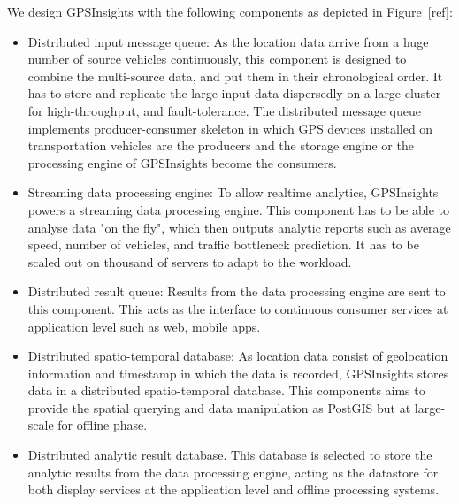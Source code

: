 \documentclass{acm_proc_article-sp}
\begin{document}

We design GPSInsights with the following components as depicted  in Figure~[ref]:

\begin{itemize}
\item 	Distributed input message queue: As the location data arrive from a huge number of source vehicles continuously, this component is designed to combine the multi-source data, and put them in their chronological order. It has to store and replicate the large input data dispersedly on a large cluster for high-throughput, and fault-tolerance. The distributed message queue implements producer-consumer skeleton in which GPS devices installed on transportation vehicles are the producers and the storage engine or the processing engine of GPSInsights become the consumers.

\item  Streaming data processing engine: To allow realtime analytics, GPSInsights powers a streaming data processing engine. This component has to be able to analyse data "on the fly", which then outputs analytic reports such as average speed, number of vehicles, and traffic bottleneck prediction. It has to be scaled out on thousand of servers to adapt to the workload.

\item  Distributed result queue: Results from the data processing engine are sent to this component. This acts as the interface to continuous consumer services at application level such as web, mobile apps. 

\item  Distributed spatio-temporal database: As location data consist of geolocation information and timestamp in which the data is recorded, GPSInsights stores data in a distributed spatio-temporal database. This components aims to provide the spatial querying and data manipulation as PostGIS but at large-scale for offline phase. 

\item  Distributed analytic result database. This database is selected to store the analytic results from the data processing engine, acting as the datastore for both display services at the application level and offline processing systems. 

\end{itemize}
\end{document}
